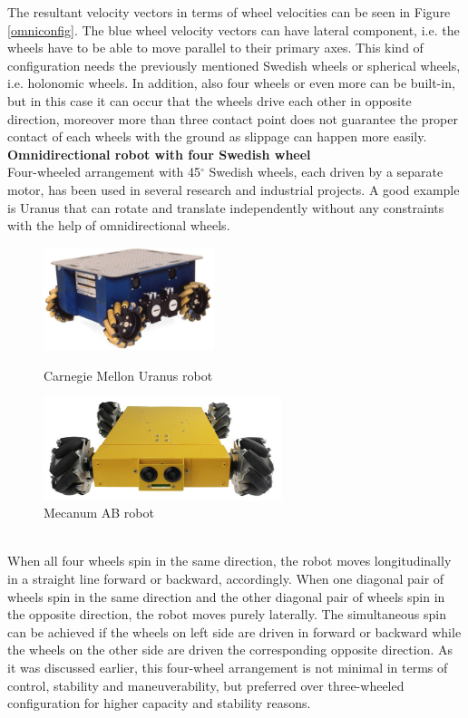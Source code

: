\documentclass[12pt,english,twoside]{article}
\begin{document}
The resultant velocity vectors in terms of wheel velocities can be seen in Figure \ref{omniconfig}. The blue wheel velocity vectors can have lateral component, i.e. the wheels have to be able to move parallel to their primary axes. This kind of configuration needs the previously mentioned Swedish wheels or spherical wheels, i.e. holonomic wheels. 
In addition, also four wheels or even more can be built-in, but in this case it can occur that the wheels drive each other in opposite direction, moreover more than three contact point does not guarantee the proper contact of each wheels with the ground as slippage can happen more easily.\\[10pt]
\noindent \textbf{Omnidirectional robot with four Swedish wheel} \\
Four-wheeled arrangement with 45$^{\circ}$ Swedish wheels, each driven by a separate motor, has been used in several research and industrial projects. A good example is Uranus that can rotate and translate independently without any constraints with the help of omnidirectional wheels.
\begin{figure}[htb!]
	\centering
	\centering
	\includegraphics[height=3cm]{figures/uranus}
	\caption{Carnegie Mellon Uranus robot}
	\endminipage\hfill
	\centering
	\includegraphics[height=3cm]{figures/mecanum}
	\caption{Mecanum AB robot}
	\label{mecanum}
	\endminipage\hfill
\end{figure} \\
When all four wheels spin in the same direction, the robot moves longitudinally in a straight line forward or backward, accordingly. When one diagonal pair of wheels spin in the same direction and the other diagonal pair of wheels spin in the opposite direction, the robot moves purely laterally. The simultaneous spin can be achieved if the wheels on left side are driven in forward or backward while the wheels on the other side are driven the corresponding opposite direction. As it was discussed earlier, this four-wheel arrangement is not minimal in terms of control, stability and maneuverability, but preferred over three-wheeled configuration for higher capacity and stability reasons. \\[10pt]
\end{document}
